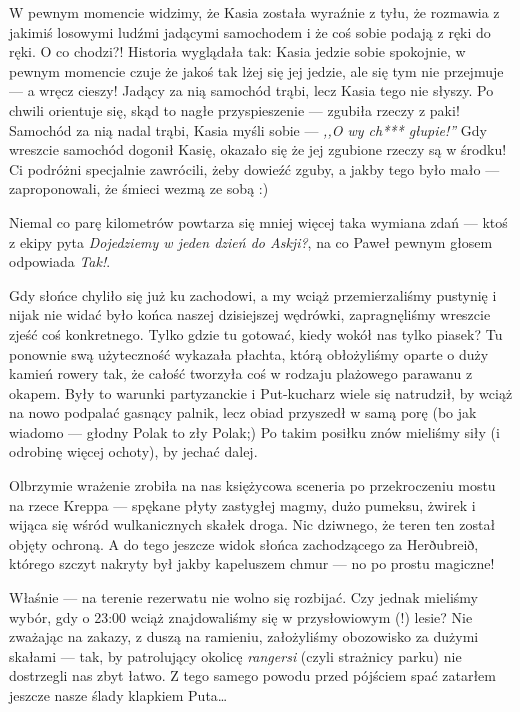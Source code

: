 
W pewnym momencie widzimy, że Kasia została wyraźnie z tyłu, że rozmawia z jakimiś losowymi ludźmi jadącymi samochodem i że coś sobie podają z ręki do ręki. O co chodzi?! Historia wyglądała tak: Kasia jedzie sobie spokojnie, w pewnym momencie czuje że jakoś tak lżej się jej jedzie, ale się tym nie przejmuje --- a wręcz cieszy! Jadący za nią samochód trąbi, lecz Kasia tego nie słyszy. Po chwili orientuje się, skąd to nagłe przyspieszenie --- zgubiła rzeczy z paki! Samochód za nią nadal trąbi, Kasia myśli sobie --- \emph{,,O wy ch*** głupie!''} Gdy wreszcie samochód dogonił Kasię, okazało się że jej zgubione rzeczy są w środku! Ci podróżni specjalnie zawrócili, żeby dowieźć zguby, a jakby tego było mało --- zaproponowali, że śmieci wezmą ze sobą :)

Niemal co parę kilometrów powtarza się mniej więcej taka wymiana zdań --- ktoś z ekipy pyta \emph{Dojedziemy w jeden dzień do Askji?}, na co Paweł pewnym głosem odpowiada \emph{Tak!}.


Gdy słońce chyliło się już ku zachodowi, a my wciąż przemierzaliśmy pustynię i nijak nie widać było końca naszej dzisiejszej wędrówki, zapragnęliśmy wreszcie zjeść coś konkretnego. Tylko gdzie tu gotować, kiedy wokół nas tylko piasek? Tu ponownie swą użyteczność wykazała płachta, którą obłożyliśmy oparte o duży kamień rowery tak, że całość tworzyła coś w rodzaju plażowego parawanu z okapem. Były to warunki partyzanckie i Put-kucharz wiele się natrudził, by wciąż na nowo podpalać gasnący palnik, lecz obiad przyszedł w samą porę (bo jak wiadomo --- głodny Polak to zły Polak;) Po takim posiłku znów mieliśmy siły (i odrobinę więcej ochoty), by jechać dalej.

Olbrzymie wrażenie zrobiła na nas księżycowa sceneria po przekroczeniu mostu na rzece Kreppa --- spękane płyty zastygłej magmy, dużo pumeksu, żwirek i wijąca się wśród wulkanicznych skałek droga. Nic dziwnego, że teren ten został objęty ochroną. A do tego jeszcze widok słońca zachodzącego za Herðubreið, którego szczyt nakryty był jakby kapeluszem chmur --- no po prostu magiczne!

Właśnie --- na terenie rezerwatu nie wolno się rozbijać. Czy jednak mieliśmy wybór, gdy o 23:00 wciąż znajdowaliśmy się w przysłowiowym (!) lesie? Nie zważając na zakazy, z duszą na ramieniu, założyliśmy obozowisko za dużymi skałami --- tak, by patrolujący okolicę \emph{rangersi} (czyli strażnicy parku) nie dostrzegli nas zbyt łatwo. Z tego samego powodu przed pójściem spać zatarłem jeszcze nasze ślady klapkiem Puta…

